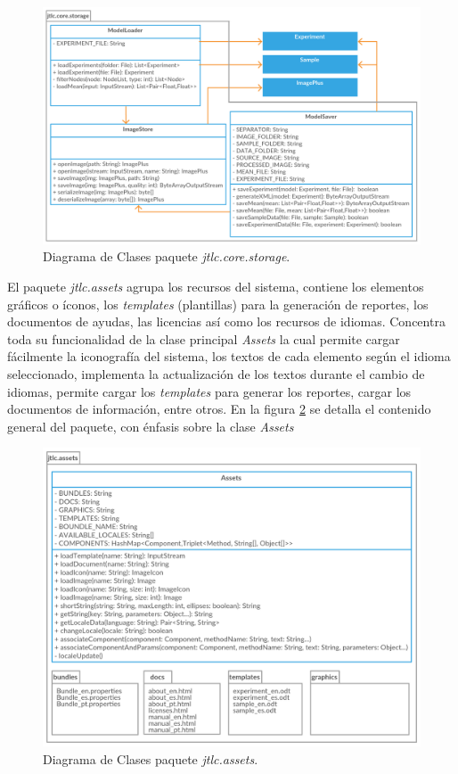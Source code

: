 \begin{figure}[H]
	\centering
	\includegraphics[width=425pt]{imagenes-jtlc/storage}
	\centering
	\vspace{-0.5cm}
	\caption{Diagrama de Clases paquete \textit{jtlc.core.storage}.}
	\label{fig:storageDiagrama}
\end{figure}

\newpage
El paquete \textit{jtlc.assets} agrupa los recursos del sistema, contiene los elementos gr\'aficos o \'iconos, los \textit{templates} (plantillas) para la generaci\'on de reportes, los documentos de ayudas, las licencias as\'i como los recursos de idiomas. Concentra toda su funcionalidad de la clase principal \textit{Assets} la cual permite cargar f\'acilmente la iconograf\'ia del sistema, los textos de cada elemento seg\'un el idioma seleccionado, implementa la actualizaci\'on de los textos durante el cambio de idiomas, permite cargar los \textit{templates} para generar los reportes, cargar los documentos de informaci\'on, entre otros. En la figura \ref{fig:assetsDiagrama} se detalla el contenido general del paquete, con \'enfasis sobre la clase \textit{Assets}

\begin{figure}[H]
	\centering
	\includegraphics[width=425pt]{imagenes-jtlc/assets}
	\centering
	\vspace{-0.5cm}
	\caption{Diagrama de Clases paquete \textit{jtlc.assets}.}
	\label{fig:assetsDiagrama}
\end{figure}

